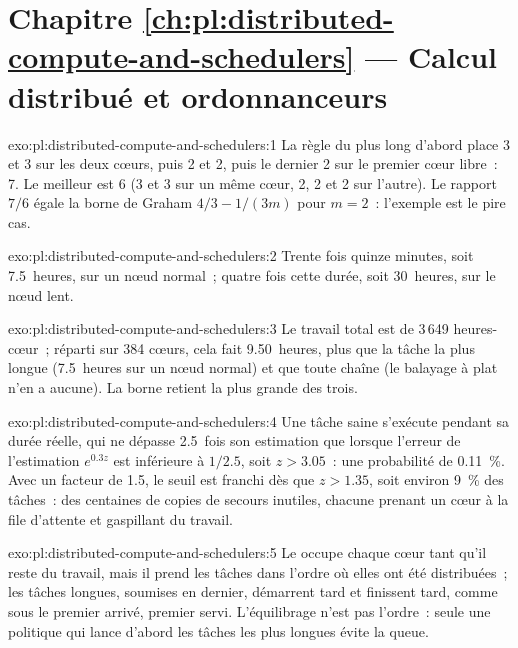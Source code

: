 \section*{Chapitre \ref{ch:pl:distributed-compute-and-schedulers} --- Calcul distribué et ordonnanceurs}

\begin{solution}{exo:pl:distributed-compute-and-schedulers:1}
La règle du plus long d'abord place 3 et 3 sur les deux cœurs, puis 2 et 2, puis le dernier 2 sur le premier cœur libre~: 7. Le meilleur est 6 (3 et 3 sur un même cœur, 2,
2 et 2 sur l'autre). Le rapport $7/6$ égale la borne de Graham $4/3 - 1/(3m)$ pour $m = 2$~: l'exemple est le pire cas.
\end{solution}

\begin{solution}{exo:pl:distributed-compute-and-schedulers:2}
Trente fois quinze minutes, soit 7.5~heures, sur un nœud normal~; quatre fois cette durée, soit 30~heures, sur le nœud lent.
\end{solution}

\begin{solution}{exo:pl:distributed-compute-and-schedulers:3}
Le travail total est de 3\,649 heures-cœur~; réparti sur 384 cœurs, cela fait 9.50~heures, plus que la tâche la plus longue (7.5~heures sur un nœud normal) et
que toute chaîne (le balayage à plat n'en a aucune). La borne retient la plus grande des trois.
\end{solution}

\begin{solution}{exo:pl:distributed-compute-and-schedulers:4}
Une tâche saine s'exécute pendant sa durée réelle, qui ne dépasse 2.5~fois son estimation que lorsque l'erreur de l'estimation $e^{0.3z}$ est inférieure à $1/2.5$, soit
$z > 3.05$~: une probabilité de 0.11~\%. Avec un facteur de 1.5, le seuil est franchi dès que $z > 1.35$, soit environ 9~\% des tâches~: des centaines de copies de secours inutiles,
chacune prenant un cœur à la file d'attente et gaspillant du travail.
\end{solution}

\begin{solution}{exo:pl:distributed-compute-and-schedulers:5}
Le  occupe chaque cœur tant qu'il reste du travail, mais il prend les tâches dans l'ordre où elles ont été distribuées~; les tâches longues, soumises en dernier, démarrent
tard et finissent tard, comme sous le premier arrivé, premier servi. L'équilibrage n'est pas l'ordre~: seule une politique qui lance d'abord les tâches les plus longues évite la queue.
\end{solution}

